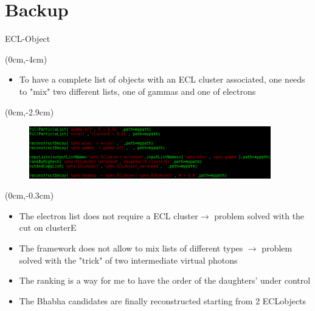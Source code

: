 \documentclass[10pt]{beamer}
\begin{document}
\section{Backup}
\appendix
\begin{frame}{ECL-Object}
	\begin{textblock*}{\textwidth}(0cm,-4cm)
		
		\begin{itemize}
			
			\item To have a complete list of objects with an ECL cluster associated, one needs to "mix" two different lists, one of gammas and one of electrons
			
		\end{itemize}
		
	\end{textblock*}
	\begin{textblock*}{\textwidth}(0cm,-2.9cm)
		
		
		\begin{figure}
			\includegraphics[width=10.5cm]{Plots/newSc}
		\end{figure}
		
	\end{textblock*}
	
	
	\begin{textblock*}{\textwidth}(0cm,-0.3cm)
		
		
		\begin{itemize}
			\item The electron list does not require a ECL cluster$\rightarrow$ problem solved with the cut on clusterE
			\item The framework does not allow to mix lists of different types $\rightarrow$ problem solved with the "trick" of two intermediate virtual photons
			\item The ranking is a way for me to have the order of the daughters' under control
			\item The Bhabha candidates are finally reconstructed starting from 2 ECLobjects
		\end{itemize}
	\end{textblock*}
\end{frame}
\end{document}
